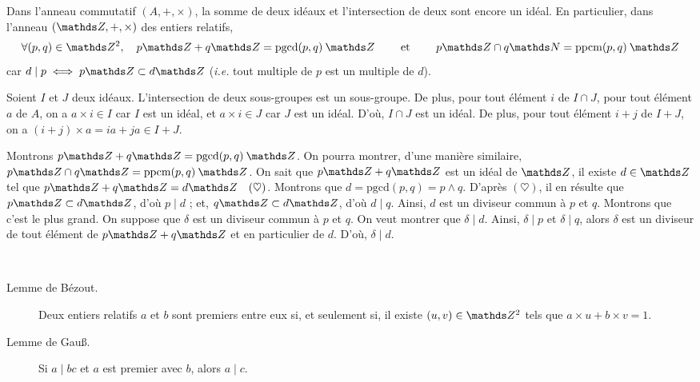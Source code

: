 \begin{prop}
	Dans l'anneau commutatif $(A, +, \times)$, la somme de deux idéaux et l'intersection de deux sont encore un idéal. En particulier, dans l'anneau $(\Z, +, \times)$ des entiers relatifs, \[
		\forall (p,q) \in \Z^2,\quad p \Z + q \Z = \mathrm{pgcd}(p,q)\:\Z \quad\quad \text{ et } \quad\quad p \Z \cap q \N = \mathrm{ppcm}(p,q)\:\Z
	\]
	car $d  \mid p \iff p \Z \subset d \Z$ (\textit{i.e.} tout multiple de $p$ est un multiple de $d$).\footnotemark
\end{prop}

\begin{prv}
	Soient $I$ et $J$ deux idéaux. L'intersection de deux sous-groupes est un sous-groupe. De plus, pour tout élément $i$ de $I \cap J$, pour tout élément $a$ de $A$, on a $a \times i \in I$ car $I$ est un idéal, et $a \times i \in J$ car $J$ est un idéal. D'où, $I \cap J$ est un idéal.
	De plus, pour tout élément $i + j$ de $I + J$, on a $(i + j) \times a = i a + j a \in I + J$.

	Montrons $p\Z + q \Z = \mathrm{pgcd}(p,q)\:\Z$. On pourra montrer, d'une manière similaire, $p \Z \cap q\Z = \mathrm{ppcm}(p,q)\:\Z$.
	On sait que $p \Z + q \Z$ est un idéal de $\Z$, il existe $d \in \Z$ tel que $p\Z + q\Z = d \Z\quad(\heartsuit)$.
	Montrons que $d = \mathrm{pgcd}(p,q) = p \wedge q$.
	D'après $(\heartsuit)$, il en résulte que $p \Z \subset d \Z$, d'où $p  \mid d$ ; et, $q \Z \subset d \Z$, d'où $d  \mid q$.
	Ainsi, $d$ est un diviseur commun à $p$ et $q$. Montrons que c'est le plus grand.
	On suppose que $\delta$ est un diviseur commun à $p$ et $q$. On veut montrer que $\delta  \mid d$.
	Ainsi, $\delta  \mid p$ et $\delta  \mid q$, alors $\delta$ est un diviseur de tout élément de $p\Z + q\Z$ et en particulier de $d$.
	D'où, $\delta  \mid  d$.
\end{prv}

\begin{crlr}~\\[-2\baselineskip]
	\begin{description}
		\item[Lemme de Bézout.] Deux entiers relatifs $a$ et $b$ sont premiers entre eux si, et seulement si, il existe $(u,v) \in \Z^2$ tels que $a \times u + b \times v = 1$.
		\item[Lemme de Gau\ss.] Si $a  \mid bc$ et $a$ est premier avec $b$, alors $a  \mid c$.
	\end{description}
\end{crlr}

